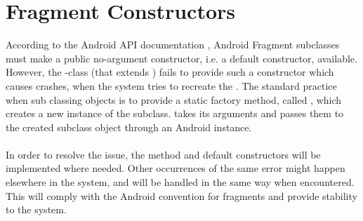 
\section{Fragment Constructors}
\label{sec:fragment_constructors}

According to the Android API documentation \parencite{android_dev_fragment}, Android Fragment subclasses must make a public no-argument constructor, i.e. a default constructor, available. However, the \giraf-class  (that extends ) fails to provide such a constructor which causes crashes, when the system tries to recreate the . The standard practice when sub classing  objects is to provide a static factory method, called , which creates a new instance of the  subclass.   takes its arguments and passes them to the created  subclass object through an Android  instance.
\\\\
In order to resolve the issue, the  method and default constructors will be implemented where needed. Other occurrences of the same error might happen elsewhere in the system, and will be handled in the same way when encountered. This will comply with the Android convention for fragments and provide stability to the system.
